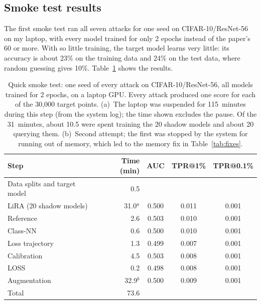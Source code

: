 \documentclass[a4paper]{article}
\begin{document}
\subsection{Smoke test results}
\label{subsec:smoke}

The first smoke test ran all seven attacks for one seed on CIFAR-10/ResNet-56 on my laptop, with every model trained for only 2 epochs instead of the paper's 60 or more.
With so little training, the target model learns very little: its accuracy is about 23\% on the training data and 24\% on the test data, where random guessing gives 10\%.
Table~\ref{tab:smoke} shows the results.

\begin{table}[!htb]
  \centering
  \small
  \begin{tabular}{@{}lrccc@{}}
    \toprule
    Step & Time (min) & AUC & TPR@1\% & TPR@0.1\% \\
    \midrule
    Data splits and target model & 0.5 & & & \\
    LiRA (20 shadow models)      & 31.0$^{a}$ & 0.500 & 0.011 & 0.001 \\
    Reference                    & 2.6   & 0.503 & 0.010 & 0.001 \\
    Class-NN                     & 0.6   & 0.500 & 0.010 & 0.001 \\
    Loss trajectory              & 1.3   & 0.499 & 0.007 & 0.001 \\
    Calibration                  & 4.5   & 0.503 & 0.008 & 0.001 \\
    LOSS                         & 0.2   & 0.498 & 0.008 & 0.001 \\
    Augmentation                 & 32.9$^{b}$  & 0.500 & 0.009 & 0.001 \\
    \midrule
    Total                        & 73.6 & & & \\
    \bottomrule
  \end{tabular}
  \caption{Quick smoke test: one seed of every attack on CIFAR-10/ResNet-56, all models trained for 2 epochs, on a laptop GPU. Every attack produced one score for each of the 30{,}000 target points. (a)~The laptop was suspended for 115~minutes during this step (from the system log); the time shown excludes the pause. Of the 31~minutes, about 10.5 were spent training the 20 shadow models and about 20 querying them. (b)~Second attempt; the first was stopped by the system for running out of memory, which led to the memory fix in Table~\ref{tab:fixes}.}
  \label{tab:smoke}
\end{table}
\end{document}
